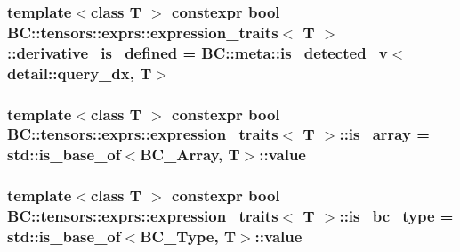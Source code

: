 \subsubsection[{\texorpdfstring{derivative\+\_\+is\+\_\+defined}{derivative_is_defined}}]{\setlength{\rightskip}{0pt plus 5cm}template$<$class T $>$ constexpr bool {\bf B\+C\+::tensors\+::exprs\+::expression\+\_\+traits}$<$ T $>$\+::derivative\+\_\+is\+\_\+defined = B\+C\+::meta\+::is\+\_\+detected\+\_\+v$<${\bf detail\+::query\+\_\+dx}, T$>$\hspace{0.3cm}{\ttfamily [static]}}\hypertarget{structBC_1_1tensors_1_1exprs_1_1expression__traits_acbcd4e07a009c38b446e8c4d96d15b4e}{}\label{structBC_1_1tensors_1_1exprs_1_1expression__traits_acbcd4e07a009c38b446e8c4d96d15b4e}
\subsubsection[{\texorpdfstring{is\+\_\+array}{is_array}}]{\setlength{\rightskip}{0pt plus 5cm}template$<$class T $>$ constexpr bool {\bf B\+C\+::tensors\+::exprs\+::expression\+\_\+traits}$<$ T $>$\+::is\+\_\+array = std\+::is\+\_\+base\+\_\+of$<${\bf B\+C\+\_\+\+Array}, T$>$\+::value\hspace{0.3cm}{\ttfamily [static]}}\hypertarget{structBC_1_1tensors_1_1exprs_1_1expression__traits_a8774f4aef36f7f53555b92560ad5b0d6}{}\label{structBC_1_1tensors_1_1exprs_1_1expression__traits_a8774f4aef36f7f53555b92560ad5b0d6}
\subsubsection[{\texorpdfstring{is\+\_\+bc\+\_\+type}{is_bc_type}}]{\setlength{\rightskip}{0pt plus 5cm}template$<$class T $>$ constexpr bool {\bf B\+C\+::tensors\+::exprs\+::expression\+\_\+traits}$<$ T $>$\+::is\+\_\+bc\+\_\+type = std\+::is\+\_\+base\+\_\+of$<${\bf B\+C\+\_\+\+Type}, T$>$\+::value\hspace{0.3cm}{\ttfamily [static]}}\hypertarget{structBC_1_1tensors_1_1exprs_1_1expression__traits_a73033f70dcd6430ed05bb8fe843ed220}{}\label{structBC_1_1tensors_1_1exprs_1_1expression__traits_a73033f70dcd6430ed05bb8fe843ed220}
